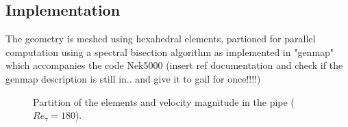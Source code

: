 \documentclass{sig-alternate}
\begin{document}


\subsection{Implementation}
\label{sec:implementation}
The geometry is meshed using hexahedral elements, partioned for parallel computation using a spectral bisection algorithm as implemented in "genmap" which accompanies the code Nek5000 (insert ref documentation and check if the genmap description is still in.. and give it to gail for once!!!!)
\begin{figure}
  \centering
  \caption{Partition of the elements and velocity magnitude in the pipe ($Re_{\tau}=180$).}
  \label{fig:partition}
\end{figure}
 
\end{document}
